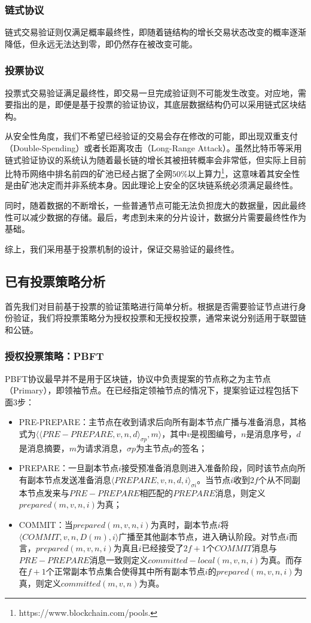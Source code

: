 \subsubsection{链式协议}
链式交易验证则仅满足概率最终性，即随着链结构的增长交易状态改变的概率逐渐降低，但永远无法达到零，即仍然存在被改变可能。


\subsubsection{投票协议}
投票式交易验证满足最终性，即交易一旦完成验证则不可能发生改变。对应地，需要指出的是，即便是基于投票的验证协议，其底层数据结构仍可以采用链式区块结构。

从安全性角度，我们不希望已经验证的交易会存在修改的可能，即出现双重支付（Double-Spending）或者长距离攻击（Long-Range Attack）。虽然比特币等采用链式验证协议的系统认为随着最长链的增长其被扭转概率会非常低，但实际上目前比特币网络中排名前四的矿池已经占据了全网$50\%$以上算力\footnote{https://www.blockchain.com/pools.}，这意味着其安全性是由矿池决定而并非系统本身。因此理论上安全的区块链系统必须满足最终性。

同时，随着数据的不断增长，一些普通节点可能无法负担庞大的数据量，因此最终性可以减少数据的存储。最后，考虑到未来的分片设计，数据分片需要最终性作为基础。

综上，我们采用基于投票机制的设计，保证交易验证的最终性。


\subsection{已有投票策略分析}
首先我们对目前基于投票的验证策略进行简单分析。根据是否需要验证节点进行身份验证，我们将投票策略分为授权投票和无授权投票，通常来说分别适用于联盟链和公链。

\subsubsection{授权投票策略：PBFT}
PBFT协议\cite{castro1999practical}最早并不是用于区块链，协议中负责提案的节点称之为主节点（Primary），即领袖节点。在已经指定领袖节点的情况下，提案验证过程包括下面3步：
\begin{itemize}
	\item PRE-PREPARE：主节点在收到请求后向所有副本节点广播与准备消息，其格式为$\langle \langle PRE-PREPARE,v,n,d \rangle_{\sigma p},m \rangle$，其中$v$是视图编号，$n$是消息序号，$d$是消息摘要，$m$为请求消息，$\sigma p$为主节点$p$的签名；
	\item PREPARE：一旦副本节点$i$接受预准备消息则进入准备阶段，同时该节点向所有副本节点发送准备消息$\langle PREPARE,v,n,d,i\rangle_{\sigma i}$。当节点$i$收到$2f$个从不同副本节点发来与$PRE-PREPARE$相匹配的$PREPARE$消息，则定义$prepared(m,v,n,i)$为真；
	\item COMMIT：当$prepared(m,v,n,i)$为真时，副本节点$i$将$\langle COMMIT,v,n,D(m),i\rangle$广播至其他副本节点，进入确认阶段。对节点$i$而言，$prepared(m,v,n,i)$为真且$i$已经接受了$2f+1$个$COMMIT$消息与$PRE-PREPARE$消息一致则定义$committed-local(m,v,n,i)$为真。而存在$f+1$个正常副本节点集合使得其中所有副本节点$i$的$prepared(m,v,n,i)$为真，则定义$committed(m,v,n)$为真。
\end{itemize}

